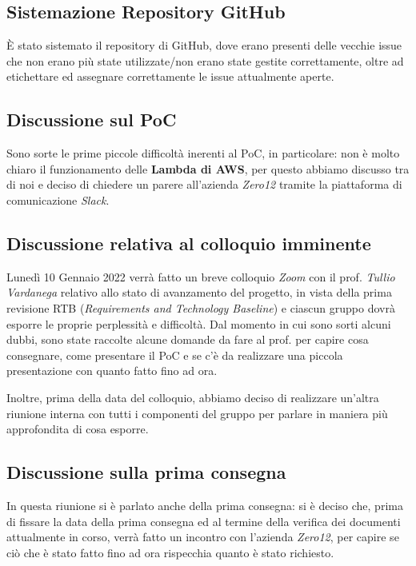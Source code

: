 \subsection{Sistemazione Repository GitHub}

È stato sistemato il repository di GitHub, dove erano presenti delle vecchie issue che non erano più state utilizzate/non erano state gestite correttamente, oltre ad etichettare ed assegnare correttamente le issue attualmente aperte.  

\subsection{Discussione sul PoC}

Sono sorte le prime piccole difficoltà inerenti al PoC, in particolare: non è molto chiaro il funzionamento delle \textbf{Lambda di AWS}, per questo abbiamo discusso tra di noi e deciso di chiedere un parere all'azienda \textit{Zero12} tramite la piattaforma di comunicazione \textit{Slack}. 

\subsection{Discussione relativa al colloquio imminente}

Lunedì 10 Gennaio 2022 verrà fatto un breve colloquio \textit{Zoom} con il prof. \textit{Tullio Vardanega} relativo allo stato di avanzamento del progetto, in vista della prima revisione RTB (\textit{Requirements and Technology Baseline}) e ciascun gruppo dovrà esporre le proprie perplessità e difficoltà. Dal momento in cui sono sorti alcuni dubbi, sono state raccolte alcune domande da fare al prof. per capire cosa consegnare, come presentare il PoC e se c'è da realizzare una piccola presentazione con quanto fatto fino ad ora.

Inoltre, prima della data del colloquio, abbiamo deciso di realizzare un'altra riunione interna con tutti i componenti del gruppo per parlare in maniera più approfondita di cosa esporre.

\subsection{Discussione sulla prima consegna}

In questa riunione si è parlato anche della prima consegna: si è deciso che, prima di fissare la data della prima consegna ed al termine della verifica dei documenti attualmente in corso, verrà fatto un incontro con l'azienda \textit{Zero12}, per capire se ciò che è stato fatto fino ad ora rispecchia quanto è stato richiesto.   